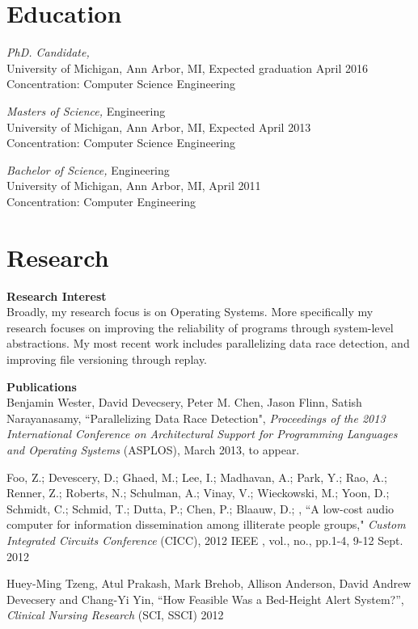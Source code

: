 \documentclass[margin, 10pt]{res} %
\begin{document}
\begin{resume}
 

\section{Education}

{\sl PhD. Candidate,} \\
University of Michigan, Ann Arbor, MI, Expected graduation April 2016 \\
Concentration: Computer Science Engineering

{\sl Masters of Science,} Engineering \\
University of Michigan, Ann Arbor, MI, Expected April 2013 \\
Concentration: Computer Science Engineering

{\sl Bachelor of Science,} Engineering \\
University of Michigan, Ann Arbor, MI, April 2011 \\
Concentration: Computer Engineering


\section{Research}
\textbf{Research Interest}\\
Broadly, my research focus is on Operating Systems.  More specifically
my research focuses on improving the reliability of programs through
system-level abstractions.  My most recent work includes parallelizing
data race detection, and improving file versioning through replay.

\textbf{Publications}\\
Benjamin Wester, David Devecsery, Peter M. Chen, Jason Flinn, Satish
Narayanasamy, ``Parallelizing Data Race Detection", {\sl Proceedings of the
2013 International Conference on Architectural Support for Programming
Languages and Operating Systems} (ASPLOS), March 2013, to appear.

Foo, Z.; Devescery, D.; Ghaed, M.; Lee, I.; Madhavan, A.; Park, Y.;
Rao, A.; Renner, Z.; Roberts, N.; Schulman, A.; Vinay, V.; Wieckowski,
M.; Yoon, D.; Schmidt, C.; Schmid, T.; Dutta, P.; Chen, P.; Blaauw,
D.; , ``A low-cost audio computer for information dissemination among
illiterate people groups," {\sl Custom Integrated Circuits Conference}
(CICC), 2012 IEEE , vol., no., pp.1-4, 9-12 Sept. 2012

Huey-Ming Tzeng, Atul Prakash, Mark Brehob, Allison Anderson, David
Andrew Devecsery and Chang-Yi Yin, ``How Feasible Was a Bed-Height
Alert System?”, {\sl Clinical Nursing Research} (SCI, SSCI) 2012


\end{resume}
\end{document}
